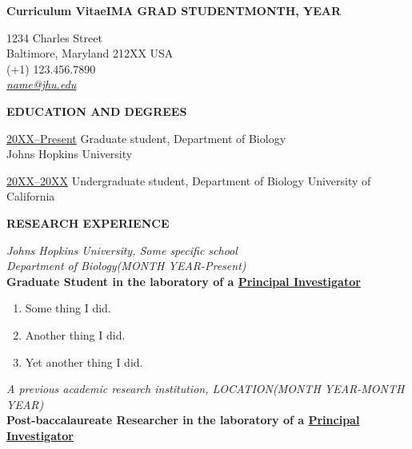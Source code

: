 



\setlength{\parindent}{0pt}

\setlength{\parskip}{6pt}

\frenchspacing

\footnotesize

\textbf{\small Curriculum Vitae\hfill\large IMA GRAD STUDENT\hfill\small MONTH, YEAR}
\begin{center}
1234 Charles Street\\
Baltimore, Maryland 212XX USA\\
(+1) 123.456.7890\\
{\color{blue} \ul{\sffamily\textit{name@jhu.edu}}}
\end{center}

\sffamily

\textbf{EDUCATION AND DEGREES}

\ul{20XX--Present} Graduate student,
Department of Biology\\
Johns Hopkins University

\ul{20XX--20XX} Undergraduate student,
Department of Biology
University of California


\textbf{RESEARCH EXPERIENCE}

\textit{Johns Hopkins University, Some specific school}\\
\textit{Department of Biology\hfill(MONTH YEAR-Present)}\\
\textbf{\rmfamily Graduate Student in the laboratory of a \ul{Principal Investigator}}

\begin{enumerate}
\item Some thing I did.
\item Another thing I did.
\item Yet another thing I did.
\end{enumerate}

\textit{A previous academic research institution, LOCATION\hfill(MONTH YEAR-MONTH YEAR)}\\
\textbf{\rmfamily Post-baccalaureate Researcher in the laboratory of a \ul{Principal Investigator}}

